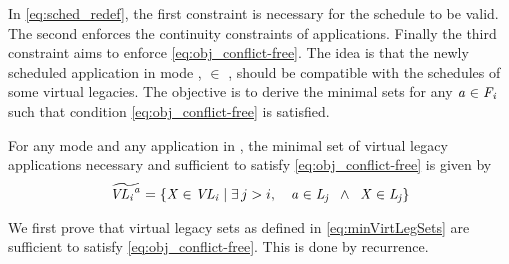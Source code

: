 In \cref{eq:sched_redef}, the first constraint \cf{\modei} is necessary for the schedule to be valid. The second enforces the continuity constraints of applications. Finally the third constraint aims to enforce \cref{eq:obj_conflict-free}. The idea is that the newly scheduled application in mode \modei, \ie \app $\in$ \freeAppi, should be compatible with the schedules of some virtual legacies. The objective is to derive the minimal sets  for any $\mathit{a_{}} \in \mathit{F_{i}}$ such that condition \cref{eq:obj_conflict-free} is satisfied.

\begin{theorem}
\label{thm:minVirtLegacy}
For any mode \modei and any application \app in \freeAppi, the minimal set of virtual legacy applications  necessary and sufficient to satisfy \eqref{eq:obj_conflict-free} is given by
\begin{equation}\label{eq:minVirtLegSets}
\widetilde{\mathit{VL_{i}}^{\mathit{a_{}}}} = \{ \mathit{X} \in \mathit{VL_{i}} \; |\;  \exists\, j>i, \quad \mathit{a_{}} \in  \mathit{L_{j}} \;\; \wedge \;\; \mathit{X} \in \mathit{L_{j}} \}
\end{equation}
\end{theorem}

\proof
We first prove that virtual legacy sets as defined in \eqref{eq:minVirtLegSets} are sufficient to satisfy \eqref{eq:obj_conflict-free}. This is done by recurrence.

